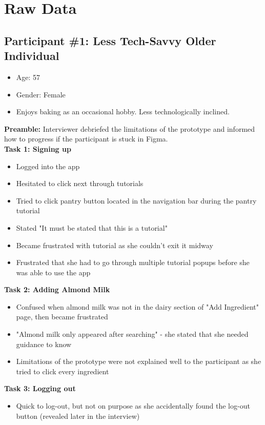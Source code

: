 \documentclass[manuscript, screen, nonacm]{acmart}
\begin{document}
\section{Raw Data}

\subsection{Participant \#1: Less Tech-Savvy Older Individual}

\begin{itemize}
    \item Age: 57
    \item Gender: Female
    \item Enjoys baking as an occasional hobby. Less technologically inclined.
\end{itemize}
\textbf{Preamble:} Interviewer debriefed the limitations of the prototype and informed how to progress if the participant is stuck in Figma.\\
\textbf{Task 1: Signing up}
\begin{itemize}
    \item Logged into the app
    \item Hesitated to click next through tutorials
    \item Tried to click pantry button located in the navigation bar during the pantry tutorial
    \item Stated "It must be stated that this is a tutorial"
    \item Became frustrated with tutorial as she couldn’t exit it midway
    \item Frustrated that she had to go through multiple tutorial popups before she was able to use the app
\end{itemize}
\textbf{Task 2: Adding Almond Milk}
\begin{itemize}
    \item Confused when almond milk was not in the dairy section of "Add Ingredient" page, then became frustrated
    \item "Almond milk only appeared after searching" - she stated that she needed guidance to know
    \item Limitations of the prototype were not explained well to the participant as she tried to click every ingredient
\end{itemize}
\textbf{Task 3: Logging out}
\begin{itemize}
    \item Quick to log-out, but not on purpose as she accidentally found the log-out button (revealed later in the interview)
\end{itemize}
\end{document}
